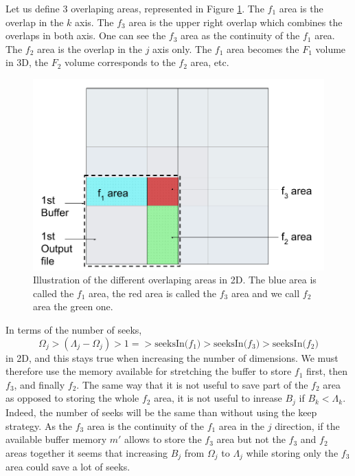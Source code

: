 \documentclass[conference]{IEEEtran}
\begin{document}
Let us define 3 overlaping areas, represented in Figure \ref{fig:areasabc}.
The $f_1$ area is the overlap in the $k$ axis.
The $f_3$ area is the upper right overlap which combines the overlaps in both axis.
One can see the $f_3$ area as the continuity of the $f_1$ area.
The $f_2$ area is the overlap in the $j$ axis only.
The $f_1$ area becomes the $F_1$ volume in 3D, the $F_2$ volume corresponds to the $f_2$ area, etc. \\

\begin{figure}[h]
\centering
\includegraphics[scale=0.20]{./figures/new/f1f2f3areas.png}
\caption{Illustration of the different overlaping areas in 2D.
The blue area is called the $f_1$ area, the red area is called the $f_3$ area and we call $f_2$ area the green one.
}
\label{fig:areasabc}
\end{figure}

In terms of the number of seeks, $$\Omega_j > (\Lambda_j-\Omega_j) > 1 => \textrm{seeksIn($f_1$)} > \textrm{seeksIn($f_3$)} > \textrm{seeksIn($f_2$)}$$ in 2D, and this stays true when increasing the number of dimensions.
We must therefore use the memory available for stretching the buffer to store $f_1$ first, then $f_3$, and finally $f_2$.
The same way that it is not useful to save part of the $f_2$ area as opposed to storing the whole $f_2$ area, it is not useful to inrease $B_j$ if $B_k < \Lambda_k$.
Indeed, the number of seeks will be the same than without using the keep strategy.
As the $f_3$ area is the continuity of the $f_1$ area in the $j$ direction, if the available buffer memory $m'$ allows to store the $f_3$ area but not the $f_3$ and $f_2$ areas together it seems that increasing $B_j$ from $\Omega_j$ to $\Lambda_j$ while storing only the $f_3$ area could save a lot of seeks. \\
\end{document}
